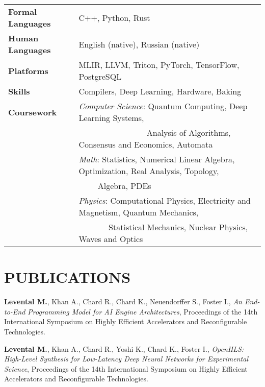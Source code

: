 \documentclass[11pt,letterpaper,roman,colorlinks,linkcolor=blue]{moderncv}
\newcommand*{\modern}{\fontfamily{qhv}\selectfont}
\newcommand{\mystyle}[1]{\textcolor{mygrey}{\modern #1}}
\newcommand{\mysectionstyle}[1]{\large\mystyle{#1}}
\begin{document}
\begin{tabular}{ @{} >{\bfseries}l @{\hspace{6ex}} l }
Formal Languages & C++, Python, Rust \\
Human Languages & English (native), Russian (native) \\
Platforms  & MLIR, LLVM, Triton, PyTorch, TensorFlow, PostgreSQL \\
Skills     & Compilers, Deep Learning, Hardware, Baking \\
Coursework & \textit{Computer Science}: Quantum Computing, Deep Learning Systems, \\
	   & $\qquad$ $\qquad$ $\qquad$ $\quad$ Analysis of Algorithms, Consensus and Economics, Automata \\
           & \textit{Math}: Statistics, Numerical Linear Algebra, Optimization, Real Analysis, Topology, \\
           & $\qquad$ \hspace{0.5ex} Algebra, PDEs  \\
           & \textit{Physics}: Computational Physics, Electricity and Magnetism, Quantum Mechanics, \\ 
           & $\qquad$ $\quad$ \hspace{0.00ex} Statistical Mechanics, Nuclear Physics, Waves and Optics
\end{tabular}


\section{\mysectionstyle{PUBLICATIONS}}

\begin{hangingpar}
\textbf{Levental M.}, Khan A., Chard R., Chard K., Neuendorffer S., Foster I.,
\textit{An End-to-End Programming Model for AI Engine Architectures},
Proceedings of the 14th International Symposium on Highly Efficient Accelerators and Reconfigurable Technologies.
\end{hangingpar}

\begin{hangingpar}
\textbf{Levental M.}, Khan A., Chard R., Yoshi K., Chard K., Foster I.,
\textit{OpenHLS: High-Level Synthesis for Low-Latency Deep Neural Networks for Experimental Science},
Proceedings of the 14th International Symposium on Highly Efficient Accelerators and Reconfigurable Technologies.
\end{hangingpar}
\end{document}
